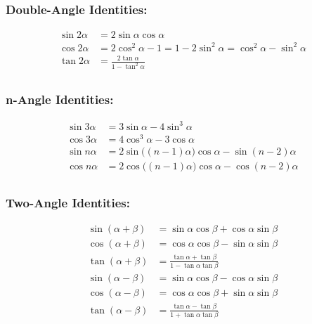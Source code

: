 \documentclass[
]{book}
\begin{document}
\hypertarget{double-angle-identities}{%
\subsubsection*{Double-Angle Identities:}\label{double-angle-identities}}

\begin{align}
\sin{2\alpha} &= 2\sin{\alpha}\cos{\alpha}\\
\cos{2\alpha} &= 2\cos^2{\alpha} - 1 = 1 - 2\sin^2{\alpha} = \cos^2{\alpha} - \sin^2{\alpha}\\
\tan{2\alpha} &= \frac{2\tan{\alpha}}{1 - \tan^2{\alpha}}\\
\end{align}

\hypertarget{n-angle-identities}{%
\subsubsection*{n-Angle Identities:}\label{n-angle-identities}}

\begin{align}
\sin{3\alpha} &= 3\sin{\alpha} - 4\sin^3{\alpha}\\
\cos{3\alpha} &= 4\cos^3{\alpha} - 3\cos{\alpha}\\
\sin{n\alpha} &= 2\sin\big(\left(n-1\right)\alpha\big) \cos{\alpha} - \sin(n-2)\alpha\\
\cos{n\alpha} &= 2\cos\big(\left(n-1\right)\alpha\big) \cos{\alpha} - \cos\left(n-2\right)\alpha\\
\end{align}

\hypertarget{two-angle-identities}{%
\subsubsection*{Two-Angle Identities:}\label{two-angle-identities}}

\begin{align}
\sin\left(\alpha + \beta\right) &= \sin{\alpha}\cos{\beta} + \cos{\alpha}\sin{\beta}\\
\cos\left(\alpha + \beta\right) &= \cos{\alpha}\cos{\beta} - \sin{\alpha}\sin{\beta}\\
\tan\left(\alpha + \beta\right) &= \frac{\tan{\alpha} + \tan{\beta}}{1 - \tan{\alpha}\tan{\beta}}\\
\sin\left(\alpha - \beta\right) &= \sin{\alpha}\cos{\beta} - \cos{\alpha}\sin{\beta}\\
\cos\left(\alpha - \beta\right) &= \cos{\alpha}\cos{\beta} + \sin{\alpha}\sin{\beta}\\
\tan\left(\alpha - \beta\right) &= \frac{\tan{\alpha} - \tan{\beta}}{1 + \tan{\alpha}\tan{\beta}}\\
\end{align}
\end{document}
